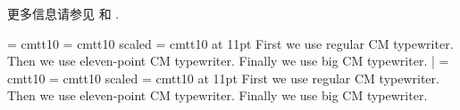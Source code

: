 更多信息请参见  和 .

\example
\font\tentt = cmtt10
\font\bigttfont = cmtt10 scaled 
\font\eleventtfont = cmtt10 at 11pt
First we use {\tentt regular CM typewriter}.
Then we use {\eleventtfont eleven-point CM typewriter}.
Finally we use {\bigttfont big CM typewriter}.
|
\produces
\font\regttfont = cmtt10
\font\bigttfont = cmtt10 scaled 
\font\eleventtfont = cmtt10 at 11pt
First we use {\regttfont regular CM typewriter}.
Then we use {\eleventtfont eleven-point CM typewriter}.
Finally we use {\bigttfont big CM typewriter}.
\endexample
\enddesc

